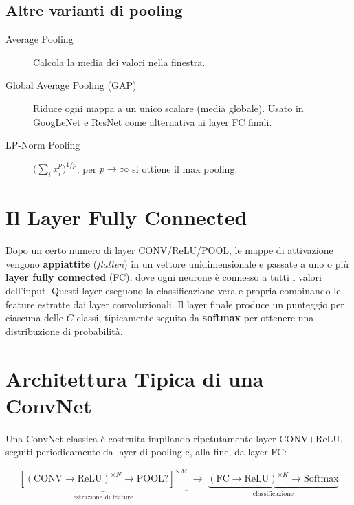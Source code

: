 \subsection{Altre varianti di pooling}
\label{subsec:other-pooling}

\begin{description}
  \item[Average Pooling] Calcola la media dei valori nella finestra.
  \item[Global Average Pooling (GAP)] Riduce ogni mappa a un unico scalare (media globale).
        Usato in GoogLeNet e ResNet come alternativa ai layer FC finali.
  \item[LP-Norm Pooling] $\bigl(\sum_i x_i^p\bigr)^{1/p}$; per $p\to\infty$ si ottiene il
        max pooling.
\end{description}

\section{Il Layer Fully Connected}
\label{sec:fc-layer}

Dopo un certo numero di layer CONV/ReLU/POOL, le mappe di attivazione vengono
\textbf{appiattite} (\emph{flatten}) in un vettore unidimensionale e passate a uno o più
\textbf{layer fully connected} (FC), dove ogni neurone è connesso a tutti i valori
dell'input. Questi layer eseguono la classificazione vera e propria combinando le feature
estratte dai layer convoluzionali. Il layer finale produce un punteggio per ciascuna delle
$C$ classi, tipicamente seguito da \textbf{softmax} per ottenere una distribuzione di
probabilità.

\section{Architettura Tipica di una ConvNet}
\label{sec:typical-arch}

Una ConvNet classica è costruita impilando ripetutamente layer CONV$+$ReLU, seguiti
periodicamente da layer di pooling e, alla fine, da layer FC:

\begin{equation}
  \underbrace{[(\text{CONV} \to \text{ReLU})^{\times N} \to \text{POOL?}]^{\times M}}
    _{\text{estrazione di feature}}
  \;\longrightarrow\;
  \underbrace{(\text{FC} \to \text{ReLU})^{\times K} \to \text{Softmax}}
    _{\text{classificazione}}
  \label{eq:typical-arch}
\end{equation}

